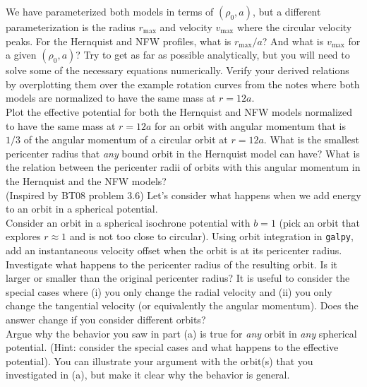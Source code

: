 \documentclass[12pt]{article}
\begin{document}
 We have parameterized both models in terms of
$(\rho_0,a)$, but a different parameterization is the radius
$r_{\mathrm{max}}$ and velocity $v_{\mathrm{max}}$ where the circular
velocity peaks. For the Hernquist and NFW profiles, what is
$r_\mathrm{max}/a$? And what is $v_\mathrm{max}$ for a given
$(\rho_0,a)$? Try to get as far as possible analytically, but you will
need to solve some of the necessary equations numerically. Verify your
derived relations by overplotting them over the example rotation
curves from the notes where both models are normalized to have the
same mass at $r=12a$.\\

 Plot the effective potential for both the Hernquist
and NFW models normalized to have the same mass at $r=12a$ for an
orbit with angular momentum that is $1/3$ of the angular momentum of a
circular orbit at $r=12a$. What is the smallest pericenter radius that
\emph{any} bound orbit in the Hernquist model can have? What is the
relation between the pericenter radii of orbits with this angular
momentum in the Hernquist and the NFW models?\\

\newpage
{} (Inspired by BT08 problem 3.6) Let's
consider what happens when we add energy to an orbit in a spherical
potential.\\

 Consider an orbit in a spherical isochrone
potential with $b=1$ (pick an orbit that explores $r \approx 1$ and is
not too close to circular). Using orbit integration in \texttt{galpy},
add an instantaneous velocity offset when the orbit is at its
pericenter radius. Investigate what happens to the pericenter radius
of the resulting orbit. Is it larger or smaller than the original
pericenter radius? It is useful to consider the special cases where
(i) you only change the radial velocity and (ii) you only change the
tangential velocity (or equivalently the angular momentum). Does the
answer change if you consider different orbits?\\

 Argue why the behavior you saw in part (a) is true
for \emph{any} orbit in \emph{any} spherical potential. (Hint:
consider the special cases and what happens to the effective
potential). You can illustrate your argument with the orbit(s) that
you investigated in (a), but make it clear why the behavior is general.\\
\end{document}
